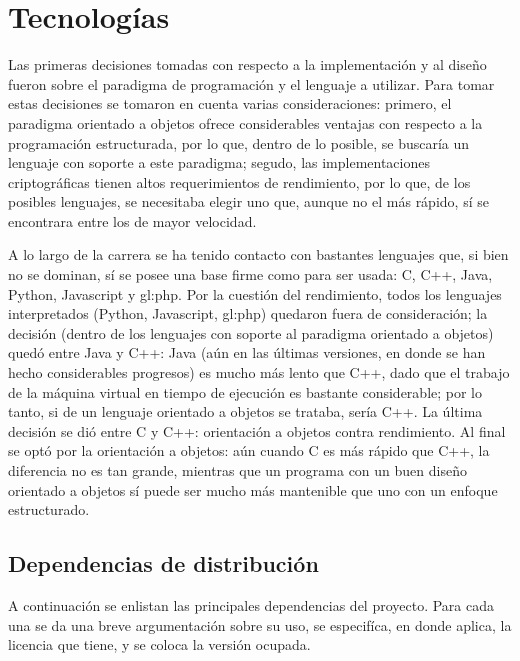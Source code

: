 %
%
%

\section{Tecnologías}
\label{sec:tecnologias}

Las primeras decisiones tomadas con respecto a la implementación y al diseño
fueron sobre el paradigma de programación y el lenguaje a utilizar. Para
tomar estas decisiones se tomaron en cuenta varias consideraciones: primero,
el paradigma orientado a objetos ofrece considerables ventajas con respecto
a la programación estructurada, por lo que, dentro de lo posible, se buscaría
un lenguaje con soporte a este paradigma; segudo, las implementaciones
criptográficas tienen altos requerimientos de rendimiento, por lo que, de los
posibles lenguajes, se necesitaba elegir uno que, aunque no el más rápido,
sí se encontrara entre los de mayor velocidad.

A lo largo de la carrera se ha tenido contacto con bastantes lenguajes que,
si bien no se dominan, sí se posee una base firme como para ser usada: C, C++,
Java, Python, Javascript y \acrshort{gl:php}. Por la cuestión del rendimiento,
todos los lenguajes interpretados (Python, Javascript, \acrshort{gl:php})
quedaron fuera de consideración; la decisión (dentro de los lenguajes con
soporte al paradigma orientado a objetos) quedó entre Java y C++: Java (aún en
las últimas versiones, en donde se han hecho considerables progresos) es mucho
más lento que C++, dado que el trabajo de la máquina virtual en tiempo de
ejecución es bastante considerable; por lo tanto, si de un lenguaje orientado a
objetos se trataba, sería C++. La última decisión se dió entre C y C++:
orientación a objetos contra rendimiento. Al final se optó por la orientación a
objetos: aún cuando C es más rápido que C++, la diferencia no es tan grande,
mientras que un programa con un buen diseño orientado a objetos sí puede ser
mucho más mantenible que uno con un enfoque estructurado.

\subsection{Dependencias de distribución}

A continuación se enlistan las principales dependencias del proyecto. Para
cada una se da una breve argumentación sobre su uso, se especifíca, en donde
aplica, la licencia que tiene, y se coloca la versión ocupada.


